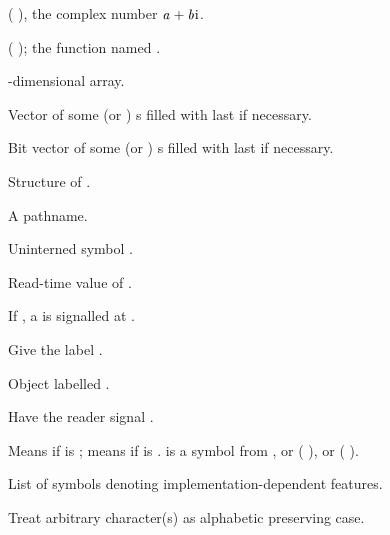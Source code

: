 \begin{LIST}{1cm}
  {
    (  ), the complex number
    $\VAR{a}+\VAR{b}\text{i}$.
  }

  {
    ( ); the function named .
  }

  {%
  -dimensional array.
  }

  {\index{\#(}%
    Vector of some (or )
    s filled with last  if necessary.
  }

  {%
    Bit vector of some (or )
    s filled with last  if necessary.
  }

  {
    Structure of .
  }

  {
    A pathname.
  }

  {
    Uninterned symbol .
  }

  {
    Read-time value of .
  }

  {
    If \NIL, a  is signalled at .
  }

  {\index{\#=}%
    Give  the label .
  }

  {\index{\#\#}%
    Object labelled .
  }

  \IT{\KWD{\#\boldmath$<$}\qquad\qquad\qquad}
  {%
    Have the reader signal .
  }
  
  {
    Means  if  is \T; means
     if  is \NIL.  is a
    symbol from , or (
    ), or ( ).
  }

  {
    List of symbols denoting implementation-dependent features.
  }

  {
    Treat arbitrary character(s)  as alphabetic preserving case.
  }
  \index{\@{$\backslash$}}%
\end{LIST}


